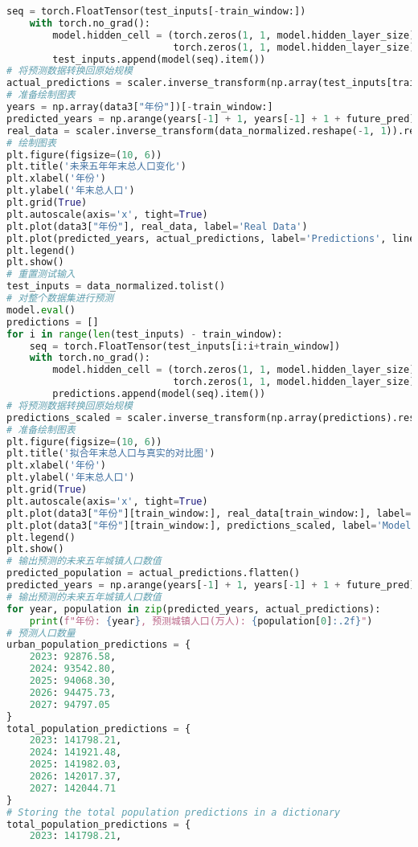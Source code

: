 \begin{lstlisting}[language=python,caption={城乡人口}]
    seq = torch.FloatTensor(test_inputs[-train_window:])
    with torch.no_grad():
        model.hidden_cell = (torch.zeros(1, 1, model.hidden_layer_size),
                             torch.zeros(1, 1, model.hidden_layer_size))
        test_inputs.append(model(seq).item())
# 将预测数据转换回原始规模
actual_predictions = scaler.inverse_transform(np.array(test_inputs[train_window:] ).reshape(-1, 1))
# 准备绘制图表
years = np.array(data3["年份"])[-train_window:]
predicted_years = np.arange(years[-1] + 1, years[-1] + 1 + future_pred)
real_data = scaler.inverse_transform(data_normalized.reshape(-1, 1)).reshape(-1)
# 绘制图表
plt.figure(figsize=(10, 6))
plt.title('未来五年年末总人口变化')
plt.xlabel('年份')
plt.ylabel('年末总人口')
plt.grid(True)
plt.autoscale(axis='x', tight=True)
plt.plot(data3["年份"], real_data, label='Real Data')
plt.plot(predicted_years, actual_predictions, label='Predictions', linestyle='--')
plt.legend()
plt.show()
# 重置测试输入
test_inputs = data_normalized.tolist()
# 对整个数据集进行预测
model.eval()
predictions = []
for i in range(len(test_inputs) - train_window):
    seq = torch.FloatTensor(test_inputs[i:i+train_window])
    with torch.no_grad():
        model.hidden_cell = (torch.zeros(1, 1, model.hidden_layer_size),
                             torch.zeros(1, 1, model.hidden_layer_size))
        predictions.append(model(seq).item())
# 将预测数据转换回原始规模
predictions_scaled = scaler.inverse_transform(np.array(predictions).reshape(-1, 1))
# 准备绘制图表
plt.figure(figsize=(10, 6))
plt.title('拟合年末总人口与真实的对比图')
plt.xlabel('年份')
plt.ylabel('年末总人口')
plt.grid(True)
plt.autoscale(axis='x', tight=True)
plt.plot(data3["年份"][train_window:], real_data[train_window:], label='Real Data')
plt.plot(data3["年份"][train_window:], predictions_scaled, label='Model Fit', linestyle='--')
plt.legend()
plt.show()
# 输出预测的未来五年城镇人口数值
predicted_population = actual_predictions.flatten()
predicted_years = np.arange(years[-1] + 1, years[-1] + 1 + future_pred)
# 输出预测的未来五年城镇人口数值
for year, population in zip(predicted_years, actual_predictions):
    print(f"年份: {year}, 预测城镇人口(万人): {population[0]:.2f}")
# 预测人口数量
urban_population_predictions = {
    2023: 92876.58,
    2024: 93542.80,
    2025: 94068.30,
    2026: 94475.73,
    2027: 94797.05
}
total_population_predictions = {
    2023: 141798.21,
    2024: 141921.48,
    2025: 141982.03,
    2026: 142017.37,
    2027: 142044.71
}
# Storing the total population predictions in a dictionary
total_population_predictions = {
    2023: 141798.21,

\end{lstlisting}
